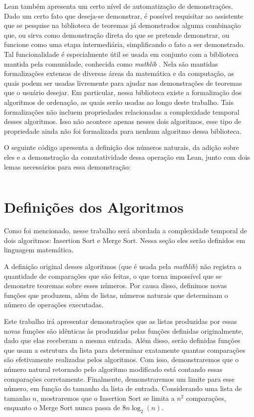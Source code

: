 \documentclass[12pt, oneside, a4paper,english,brazil]{abntex2}
\begin{document}
\qquad Lean tamb\'em apresenta um certo n\'ivel de automatiza\c{c}\~ao de demonstra\c{c}\~oes. Dado um certo fato
que deseja-se demonstrar, \'e poss\'ivel requisitar ao assistente que se pesquise na biblioteca de teoremas j\'a
demonstrados alguma combina\c{c}\~ao que, ou sirva como demonstra\c{c}\~ao direta do que se pretende demonstrar,
ou funcione como uma etapa intermedi\'aria, simplificando o fato a ser demonstrado. Tal funcionalidade \'e
especialmente \'util se usada em conjunto com a biblioteca mantida pela comunidade, conhecida como
\textit{mathlib} \cite{3}. Nela s\~ao mantidas formaliza\c{c}\~oes extensas de diversas \'areas da matem\'atica e da
computa\c{c}\~ao, as quais podem ser usadas livremente para ajudar nas demonstra\c{c}\~oes de teoremas que o
usu\'ario desejar. Em particular, nessa biblioteca existe a formaliza\c{c}\~ao dos algoritmos de ordena\c{c}\~ao,
as quais ser\~ao usadas ao longo deste trabalho. Tais formaliza\c{c}\~oes
n\~ao incluem propriedades relacionadas a complexidade temporal desses algoritmos. Isso n\~ao acontece
apenas nesses dois algoritmos,
esse tipo de propriedade ainda n\~ao foi formalizada para nenhum algoritmo dessa biblioteca.

\qquad O seguinte c\'odigo apresenta a defini\c{c}\~ao dos n\'umeros naturais, da adi\c{c}\~ao sobre eles e a
demonstra\c{c}\~ao da comutatividade dessa opera\c{c}\~ao em Lean, junto com dois lemas necess\'arios para essa
demonstra\c{c}\~ao:
\newpage

\inputminted{lean}{add.lean}

\chapter{Defini\c{c}\~oes dos Algoritmos}

\qquad Como foi mencionado, nesse trabalho ser\'a abordada a complexidade
temporal de dois algoritmos: Insertion Sort e Merge Sort. Nessa se\c{c}\~ao
eles ser\~ao definidos em linguagem matem\'atica.

\qquad A defini\c{c}\~ao original desses algoritmos (que \'e usada pela \textit{mathlib})
n\~ao registra a quantidade de compara\c{c}\~oes que
s\~ao feitas, o que torna imposs\'ivel que se demonstre
teoremas sobre esses n\'umeros. Por causa
disso, definimos novas fun\c{c}\~oes que produzem, al\'em de listas,
n\'umeros naturais que determinam o n\'umero de opera\c{c}\~oes executadas.

\qquad Este trabalho ir\'a apresentar demonstra\c{c}\~oes que as listas
produzidas por essas novas fun\c{c}\~oes s\~ao id\^enticas \`as produzidas pelas
fun\c{c}\~oes definidas originalmente, dado que elas receberam a mesma entrada. Al\'em
disso, ser\~ao definidas fun\c{c}\~oes que usam a estrutura da lista para
determinar exatamente quantas compara\c{c}\~oes s\~ao efetivamente realizadas
pelos algoritmos. Com isso, demonstraremos que o n\'umero natural retornado pelo
algoritmo modificado est\'a contando essas compara\c{c}\~oes corretamente. Finalmente,
demonstraremos um limite para esse n\'umero, em fun\c{c}\~ao do tamanho da lista de entrada.
Considerando uma lista de tamanho $n$, mostraremos que o Insertion Sort se limita a $n^{2}$
compara\c{c}\~oes, enquanto o Merge Sort nunca passa de $8 n \log_{2} (n)$.
\end{document}
